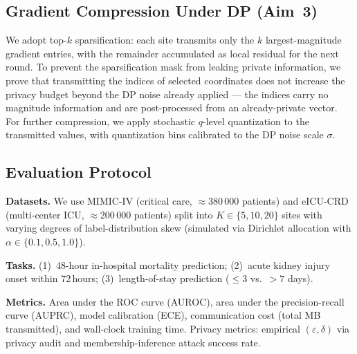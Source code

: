\subsection{Gradient Compression Under DP (Aim~3)}

We adopt top-$k$ sparsification: each site transmits only the $k$ largest-magnitude gradient
entries, with the remainder accumulated as local residual for the next round. To prevent
the sparsification mask from leaking private information, we prove that transmitting the
indices of selected coordinates does not increase the privacy budget beyond the DP noise
already applied — the indices carry no magnitude information and are post-processed from
an already-private vector. For further compression, we apply stochastic
$q$-level quantization to the transmitted values, with quantization bins calibrated to the
DP noise scale $\sigma$.

\subsection{Evaluation Protocol}

\textbf{Datasets.} We use MIMIC-IV (critical care, $\approx$380\,000 patients) and
eICU-CRD (multi-center ICU, $\approx$200\,000 patients) split into $K \in \{5, 10, 20\}$
sites with varying degrees of label-distribution skew (simulated via Dirichlet allocation
with $\alpha \in \{0.1, 0.5, 1.0\}$).

\textbf{Tasks.} (1)~48-hour in-hospital mortality prediction; (2)~acute kidney injury
onset within 72\,hours; (3)~length-of-stay prediction ($\leq 3$ vs.\ $> 7$ days).

\textbf{Metrics.} Area under the ROC curve (AUROC), area under the precision-recall curve
(AUPRC), model calibration (ECE), communication cost (total MB transmitted), and wall-clock
training time. Privacy metrics: empirical $(\varepsilon,\delta)$ via privacy audit and
membership-inference attack success rate.

